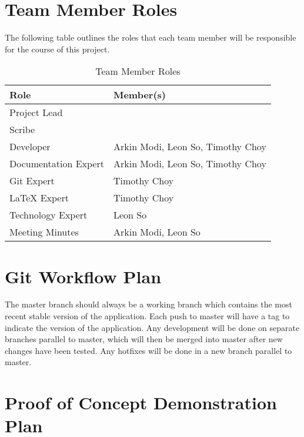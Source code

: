 \documentclass{article}
\begin{document}
\section{Team Member Roles}
The following table outlines the roles that each team member will be responsible for the course of this project.

\begin{table}[h]
    \centering
    \begin{tabular}{|l|l|}
        \hline
        \textbf{Role} & \textbf{Member(s)} \\
        \hline
        Project Lead & \\
        \hline
        Scribe & \\
        \hline
        Developer & Arkin Modi, Leon So, Timothy Choy \\
        \hline
        Documentation Expert & Arkin Modi, Leon So, Timothy Choy \\
        \hline
        Git Expert & Timothy Choy \\
        \hline
        LaTeX Expert & Timothy Choy \\
        \hline
        Technology Expert & Leon So \\
        \hline
        Meeting Minutes & Arkin Modi, Leon So \\
        \hline
    \end{tabular}
    \caption{Team Member Roles}
\end{table}


\section{Git Workflow Plan}
The master branch should always be a working branch which contains the most recent stable version of the application. Each push to master will have a tag to indicate the version of the application. Any development will be done on separate branches parallel to master, which will then be merged into master after new changes have been tested. Any hotfixes will be done in a new branch parallel to master.

\section{Proof of Concept Demonstration Plan}
\end{document}
